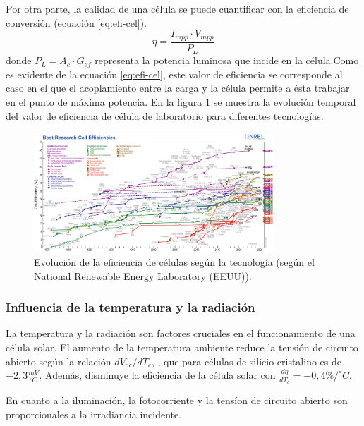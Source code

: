 Por otra parte, la calidad de una célula se puede cuantificar con la eficiencia de conversión (ecuación \ref{eq:efi-cel}).
\begin{equation}
\eta =\frac{I_{mpp}\cdot V_{mpp}}{P_L}
\label{eq:efi-cel}
\end{equation}
donde \(P_L=A_c\cdot G_{ef}\) representa la potencia luminosa que incide en la célula.Como es evidente de la ecuación \ref{eq:efi-cel}, este valor de eficiencia se corresponde al caso en el que el acoplamiento entre la carga y la célula permite a ésta trabajar en el punto de máxima potencia. En la figura \ref{fig:orga040c24} se muestra la evolución temporal del valor de eficiencia de célula de laboratorio para diferentes tecnologías.

\begin{figure}[htbp]
\centering
\includegraphics[keepaspectratio,width=0.8\textwidth,height=0.5\textheight]{figuras/cell-efficiencies.pdf}
\caption{\label{fig:orga040c24}Evolución de la eficiencia de células según la tecnología (según el National Renewable Energy Laboratory \cite{nrel24} (EEUU)).}
\end{figure}

\subsubsection{Influencia de la temperatura y la radiación}
\label{sec:org7520981}
La temperatura y la radiación son factores cruciales en el funcionamiento de una célula solar. El aumento de la temperatura ambiente reduce la tensión de circuito abierto según la relación \(dV_{oc}/dT_c\), , que para células de silicio cristalino es de\(-2,3\frac{mV}{^\circ C}\). Además, disminuye la eficiencia de la célula solar con \(\frac{d\eta}{dT_c}=-0,4\%/^\circ C\).

En cuanto a la iluminación, la fotocorriente y la tensíon de circuito abierto son proporcionales a la irradiancia incidente.

